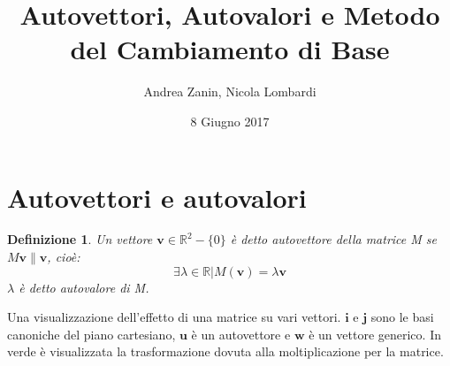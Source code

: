 \documentclass[10pt,a4paper]{article}
\author{Andrea Zanin, Nicola Lombardi}
\title{\textbf{Autovettori, Autovalori e Metodo del Cambiamento di Base}}
\date{8 Giugno 2017}
\theoremstyle{plain}
\newtheorem{definizione}[subsection]{Definizione}
\theoremstyle{definition}
\begin{document}
\maketitle
\section{Autovettori e autovalori}
\begin{definizione}
	Un vettore $\mathbf{v} \in \mathbb{R}^2 -\{{0}\}$ è detto autovettore della matrice M se $M\mathbf{v}\parallel\mathbf{v}$, cioè: \\
	\[\exists \lambda \in \mathbb{R} \vert M(\mathbf{v})=\lambda\mathbf{v}\]
	$\lambda$ è detto autovalore di M.
\end{definizione}
Una visualizzazione dell'effetto di una matrice su vari vettori. $\mathbf{i}$ e $\mathbf{j}$ sono le basi canoniche del piano cartesiano, $\mathbf{u}$ è un autovettore e $\mathbf{w}$ è un vettore generico. In verde è visualizzata la trasformazione dovuta alla moltiplicazione per la matrice.\\
\end{document}
